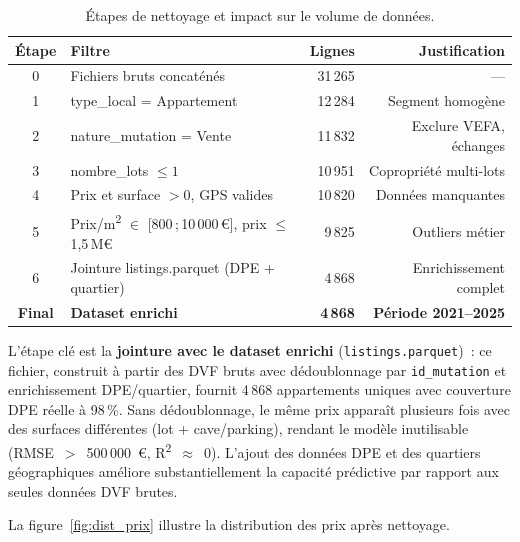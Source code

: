\documentclass[12pt,a4paper]{article}
\begin{document}
\begin{table}[H]
\centering
\caption{\'Etapes de nettoyage et impact sur le volume de donn\'ees.}
\label{tab:nettoyage}
\small
\begin{tabular}{clrr}
\toprule
\textbf{\'Etape} & \textbf{Filtre} & \textbf{Lignes} & \textbf{Justification} \\
\midrule
0 & Fichiers bruts concat\'en\'es & 31\,265 & --- \\
1 & type\_local = Appartement & 12\,284 & Segment homog\`ene \\
2 & nature\_mutation = Vente & 11\,832 & Exclure VEFA, \'echanges \\
3 & nombre\_lots $\leq 1$ & 10\,951 & Copropri\'et\'e multi-lots \\
4 & Prix et surface $> 0$, GPS valides & 10\,820 & Donn\'ees manquantes \\
5 & Prix/m\textsuperscript{2} $\in$ [800\,;\,10\,000\,\euro], prix $\leq$ 1{,}5\,M\euro & 9\,825 & Outliers m\'etier \\
6 & Jointure listings.parquet (DPE + quartier) & 4\,868 & Enrichissement complet \\
\midrule
\textbf{Final} & \textbf{Dataset enrichi} & \textbf{4\,868} & \textbf{P\'eriode 2021--2025} \\
\bottomrule
\end{tabular}
\end{table}

\begin{descrbox}
L'\'etape cl\'e est la \textbf{jointure avec le dataset enrichi} (\texttt{listings.parquet})~: ce fichier, construit \`a partir des DVF bruts avec d\'edoublonnage par \texttt{id\_mutation} et enrichissement DPE/quartier, fournit 4\,868 appartements uniques avec couverture DPE r\'eelle \`a 98\,\%. Sans d\'edoublonnage, le m\^eme prix appara\^it plusieurs fois avec des surfaces diff\'erentes (lot + cave/parking), rendant le mod\`ele inutilisable (RMSE~$>$~500\,000~\euro, R\textsuperscript{2}~$\approx$~0). L'ajout des donn\'ees DPE et des quartiers g\'eographiques am\'eliore substantiellement la capacit\'e pr\'edictive par rapport aux seules donn\'ees DVF brutes.
\end{descrbox}

\vspace{0.5cm}

\noindent La figure~\ref{fig:dist_prix} illustre la distribution des prix apr\`es nettoyage.
\end{document}
